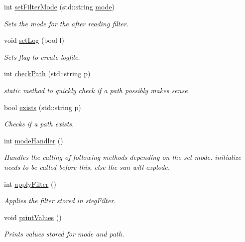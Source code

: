 \begin{DoxyCompactItemize}
int \mbox{\hyperlink{classSteganoMessage_a5c3ef910b17f4bbe32a73a33be9d7586}{set\+Filter\+Mode}} (std\+::string \mbox{\hyperlink{classSteganoMessage_a8772194b7823da730648f8d4c06334a8}{mode}})
\begin{DoxyCompactList}\small\item\em Sets the mode for the after reading filter. \end{DoxyCompactList}\item 
void \mbox{\hyperlink{classSteganoMessage_a438e9d5189a8e3b83021fada4a6a469c}{set\+Log}} (bool l)
\begin{DoxyCompactList}\small\item\em Sets flag to create logfile. \end{DoxyCompactList}\item 
int \mbox{\hyperlink{classSteganoMessage_a9d87adef1584cc184ccd4b5d86fba744}{check\+Path}} (std\+::string p)
\begin{DoxyCompactList}\small\item\em static method to quickly check if a path possibly makes sense \end{DoxyCompactList}\item 
bool \mbox{\hyperlink{classSteganoMessage_acc5a49a35b46d8bf4c40cca8b8c5a52b}{exists}} (std\+::string p)
\begin{DoxyCompactList}\small\item\em Checks if a path exists. \end{DoxyCompactList}\item 
int \mbox{\hyperlink{classSteganoMessage_a2649e515941e730520b759282d00dcd6}{mode\+Handler}} ()
\begin{DoxyCompactList}\small\item\em Handles the calling of following methods depending on the set mode. initialize needs to be called before this, else the sun will explode. \end{DoxyCompactList}\item 
int \mbox{\hyperlink{classSteganoMessage_aec575d6949cf2eb49adefe2f1299d075}{apply\+Filter}} ()
\begin{DoxyCompactList}\small\item\em Applies the filter stored in steg\+Filter. \end{DoxyCompactList}\item 
void \mbox{\hyperlink{classSteganoMessage_a3ea3f5ff720bf56d33f168d47e2897b0}{print\+Values}} ()
\begin{DoxyCompactList}\small\item\em Prints values stored for mode and path. \end{DoxyCompactList}\end{DoxyCompactItemize}

